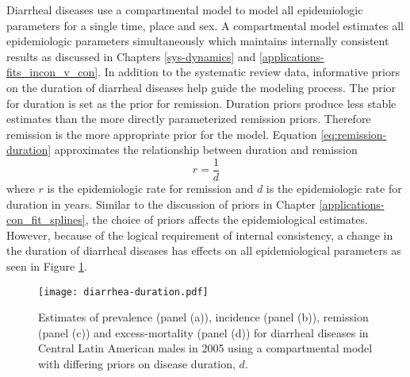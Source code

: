 Diarrheal diseases use a compartmental model to model all epidemiologic parameters for a single time, place and sex.  A compartmental model estimates all epidemiologic parameters simultaneously which maintains internally consistent results as discussed in Chapters \ref{sys-dynamics} and \ref{applications-fits_incon_v_con}.  In addition to the systematic review data, informative priors on the duration of diarrheal diseases help guide the modeling process.  The prior for duration is set as the prior for remission.  Duration priors produce less stable estimates than the more directly parameterized remission priors.  Therefore remission is the more appropriate prior for the model.  Equation \ref{eq:remission-duration} approximates the relationship between duration and remission
    \begin{equation} \label{eq:remission-duration}
    	r = \frac{1}{d}
    \end{equation}
where $r$ is the epidemiologic rate for remission and $d$ is the epidemiologic rate for duration in years.  Similar to the discussion of priors in Chapter \ref{applications-con_fit_splines}, the choice of priors affects the epidemiological estimates.  However, because of the logical requirement of internal consistency, a change in the duration of diarrheal diseases has effects on all epidemiological parameters as seen in Figure \ref{fig:app-diarrhea duration}.

    \begin{figure}[h]
        \begin{center}
            \texttt{[image: diarrhea-duration.pdf]}
            \caption{Estimates of prevalence (panel (a)), incidence (panel (b)), remission (panel (c)) and excess-mortality (panel (d)) for diarrheal diseases in Central Latin American males in 2005 using a compartmental model with differing priors on disease duration, $d$.}
            \label{fig:app-diarrhea duration}
        \end{center}
    \end{figure}
